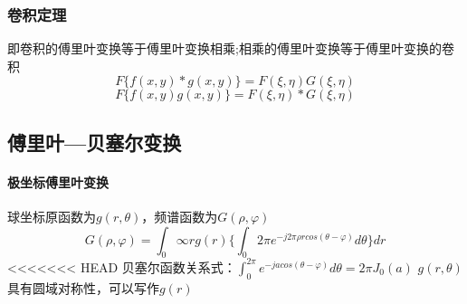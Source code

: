 \documentclass[UTF8]{ctexart}
\begin{document}
\subsubsection{卷积定理}即卷积的傅里叶变换等于傅里叶变换相乘;相乘的傅里叶变换等于傅里叶变换的卷积\[
    F\{f(x,y)*g(x,y)\}=F(\xi,\eta)G(\xi,\eta)
    \]
    \[
        F\{f(x,y)g(x,y)\}=F(\xi,\eta)*G(\xi,\eta)
        \]

\subsection{傅里叶—贝塞尔变换}
\paragraph{极坐标傅里叶变换}球坐标原函数为$g(r,\theta)$，频谱函数为$G(\rho,\varphi)$
\[
  G(\rho,\varphi)=\int_{0}{\infty}rg(r)\{\int_{0}{2\pi}e^{-j2\pi\rho rcos(\theta-\varphi)}d\theta\}dr
  \]
<<<<<<< HEAD
  贝塞尔函数关系式：$\int_{0}^{2\pi}e^{-jacos(\theta-\varphi)}d\theta=2\pi J_{0}(a)$
$g(r,\theta)$具有圆域对称性，可以写作$g(r)$
\end{document}
